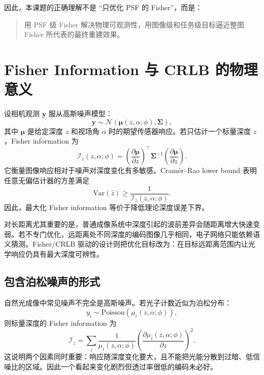 \documentclass[11pt,a4paper,fontset=none]{ctexart}
\begin{document}
因此，本课题的正确理解不是 ``只优化 PSF 的 Fisher''，而是：
\begin{quote}
用 PSF 级 Fisher 解决物理可观测性，用图像级和任务级目标逼近整图 Fisher 所代表的最终重建效果。
\end{quote}

\section{Fisher Information 与 CRLB 的物理意义}

设相机观测 $\bm y$ 服从高斯噪声模型：
\begin{equation}
  \bm y \sim \mathcal N(\bm \mu(z,\alpha;\phi),\bm \Sigma),
\end{equation}
其中 $\bm \mu$ 是给定深度 $z$ 和视场角 $\alpha$ 时的期望传感器响应。若只估计一个标量深度 $z$，Fisher information 为
\begin{equation}
  \mathcal I_z(z,\alpha;\phi)
  =
  \left(\frac{\partial \bm \mu}{\partial z}\right)^\top
  \bm \Sigma^{-1}
  \left(\frac{\partial \bm \mu}{\partial z}\right).
  \label{eq:fisher_scalar}
\end{equation}
它衡量图像响应相对于噪声对深度变化有多敏感。Cramér--Rao lower bound 表明任意无偏估计器的方差满足
\begin{equation}
  \mathrm{Var}(\hat z) \ge \frac{1}{\mathcal I_z(z,\alpha;\phi)}.
\end{equation}
因此，最大化 Fisher information 等价于降低理论深度误差下界。

对长距离尤其重要的是，普通成像系统中深度引起的波前差异会随距离增大快速变弱。若不专门优化，远距离处不同深度的编码图像几乎相同，电子网络只能依赖语义猜测。Fisher/CRLB 驱动的设计则把优化目标改为：在目标远距离范围内让光学响应仍具有最大深度可辨性。

\subsection{包含泊松噪声的形式}

自然光成像中常见噪声不完全是高斯噪声。若光子计数近似为泊松分布：
\begin{equation}
  y_i \sim \mathrm{Poisson}(\mu_i(z,\alpha;\phi)),
\end{equation}
则标量深度的 Fisher information 为
\begin{equation}
  \mathcal I_z
  =
  \sum_i
  \frac{1}{\mu_i(z,\alpha;\phi)}
  \left(
  \frac{\partial \mu_i(z,\alpha;\phi)}{\partial z}
  \right)^2.
\end{equation}
这说明两个因素同时重要：响应随深度变化要大，且不能把光能分散到过暗、低信噪比的区域。因此一个看起来变化剧烈但透过率很低的编码未必好。
\end{document}
